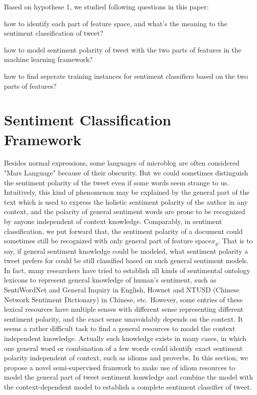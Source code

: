 \documentclass{llncs}
\begin{document}
Based on hypothese 1, we studied following questions in this paper:
\begin{itemize*}
\item how to identify each part of feature space, and what's the meaning to the 
sentiment classification of tweet?
\item how to model sentiment polarity of tweet with the two parts of features in 
the machine learning framework?
\item how to find seperate training instances for sentiment classifiers based on 
the two parts of features?
\end{itemize*}
\section{Sentiment Classification Framework}
\label{framework}
Besides normal expressions, some languages of microblog are often considered "Mars Language" because of their obscurity. 
But we could sometimes distinguish the sentiment polarity of the tweet even if some words seem strange to us.
Intuitively, this kind of phenomenon may be explained by the general part of the text which is used to express the holistic sentiment polarity of the author in any context, and the polarity of general sentiment words are prone to be recognized by anyone independent of context knowledge. 
Comparably, in sentiment classification, we put forward that, the sentiment polarity of a document could sometimes still be recognized with only general part of feature space$ x_{g} $. 
That is to say, if general sentiment knowledge could be modeled, what sentiment polarity a tweet prefers for could be still classified based on such general sentiment models.\\
In fact, many researchers have tried to establish all kinds of sentimental ontology lexicons to represent general knowledge of human’s sentiment, such as SentiWordNet\cite{xsongx:b17} and General Inquiry\cite{xsongx:b18} in English, Hownet\cite{xsongx:b19} and NTUSD (Chinese Network Sentiment Dictionary) in Chinese\cite{xsongx:b20}, etc. 
However, some entries of these lexical resources have multiple senses with different sense representing different sentiment polarity, and the exact sense unavoidably depends on the context.
It seems a rather difficult task to find a general resources to model the context independent knowledge.
Actually such knowledge exists in many cases, in which one general word or combination of a few words could identify exact sentiment polarity independent of context, such as idioms and proverbs. 
In this section, we propose a novel semi-supervised framwork to make use of idiom resources to model the general part of tweet sentiment konwledge and combine the model with 
the context-dependent model to establish a complete sentiment classifier of tweet.
\end{document}
